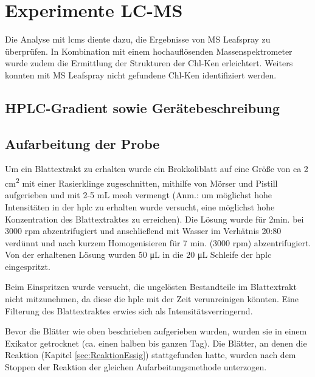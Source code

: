 \chapter{Experimente LC-MS} 

Die Analyse mit \gls{lcms} diente dazu, die Ergebnisse von MS Leafspray zu überprüfen. In Kombination mit einem hochauflösenden Massenspektrometer wurde zudem die Ermittlung der Strukturen der \gls{Chl-K}en erleichtert. Weiters konnten mit MS Leafspray nicht gefundene \gls{Chl-K}en identifiziert werden. \\

\section{HPLC-Gradient sowie Gerätebeschreibung} \label{sec:HPLCAufarbeitungderProbe} 

\section{Aufarbeitung der Probe} \label{sec:HPLCAufarbeitungderProbe}

Um ein Blattextrakt zu erhalten wurde ein Brokkoliblatt auf eine Größe von \gls{ca} 2 \si{cm^{2}} mit einer Rasierklinge zugeschnitten, mithilfe von Mörser und Pistill aufgerieben und mit 2-5 mL \gls{meoh} vermengt (Anm.: um möglichst hohe Intensitäten in der \gls{hplc} zu erhalten wurde versucht, eine möglichst hohe Konzentration des Blattextraktes zu erreichen). Die Lösung wurde für 2min. bei 3000 rpm abzentrifugiert und anschließend mit Wasser im Verhätnis 20:80 verdünnt und nach kurzem Homogenisieren für 7 min. (3000 rpm) abzentrifugiert. Von der erhaltenen Lösung wurden 50 \si{\uL} in die 20 \si{\uL} Schleife der \gls{hplc} eingespritzt. 


Beim Einspritzen wurde versucht, die ungelösten Bestandteile im Blattextrakt nicht mitzunehmen, da diese die \gls{hplc} mit der Zeit verunreinigen könnten. Eine Filterung des Blattextraktes erwies sich als Intensitätsverringernd.

Bevor die Blätter wie oben beschrieben aufgerieben wurden, wurden sie in einem Exikator getrocknet (ca. einen halben bis ganzen Tag). Die Blätter, an denen die Reaktion (Kapitel \ref{sec:ReaktionEssig}) stattgefunden hatte, wurden nach dem Stoppen der Reaktion der gleichen Aufarbeitungsmethode unterzogen. 

